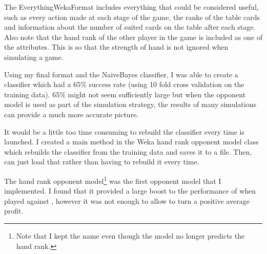 


The EverythingWekaFormat includes everything that could be considered useful, such as every action made at each stage of the game, the ranks of the table cards and information about the number of suited cards on the table after each stage. Also note that the hand rank of the other player in the game is included as one of the attributes. This is so that the strength of \mbts hand is not ignored when simulating a game.



Using my final format and the NaiveBayes classifier, I was able to create a classifier which had a 65\% success rate (using 10 fold cross validation on the training data). 65\% might not seem sufficiently large but when the opponent model is used as part of the simulation strategy, the results of many simulations can provide a much more accurate picture.

It would be a little too time consuming to rebuild the classifier every time \mbt is launched. I created a main method in the Weka hand rank opponent model class which rebuilds the classifier from the training data and saves it to a file. Then, \mbt can just load that rather than having to rebuild it every time. 

The hand rank opponent model\footnote{Note that I kept the name even though the model no longer predicts the hand rank.} was the first opponent model that I implemented. I found that it provided a large boost to the performance of \mbt when played against \sbt, however it was not enough to allow \mbt to turn a positive average profit. 



